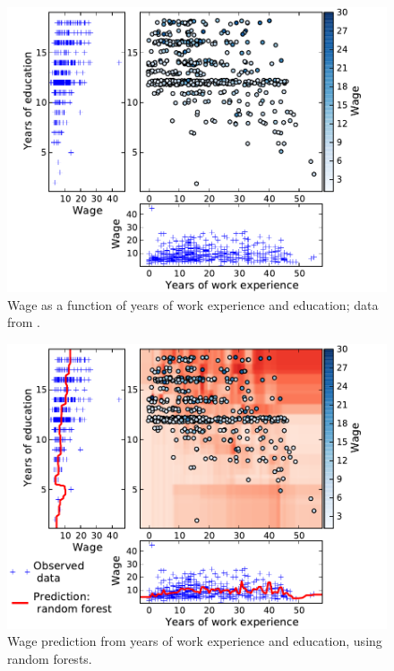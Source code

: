 \documentclass[a4paper]{article}
\begin{document}
\begin{figure}[t]
    \includegraphics[width=1.05\linewidth]{wage_data}%

    \caption{Wage as a function of years of work experience and
    education; data from \cite{berndt1991}\label{fig:data}.}
\end{figure}

\begin{figure}[b]
    \includegraphics[width=1.05\linewidth]{wage_data_random_forest}%

    \caption{Wage prediction from years of work experience and education,
    using random forests.\label{fig:random_forest}}
\end{figure}
\end{document}

